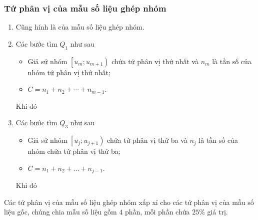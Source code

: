 \subsubsection{Tứ phân vị của mẫu số liệu ghép nhóm}
\begin{enumerate}[\iconMT]
	\item {} Cũng hính là  của mẫu số liệu ghép nhóm.
	\item {} Các bước tìm $Q_1$ như sau
	\begin{itemize}
		\item Giả sử nhóm $ \left[ u_m ; u_{m+1}\right)$ chứa tứ phân vị thứ nhất và $ n_m $ là tần số của nhóm tứ phân vị thứ nhất;
		\item $ C=n_1+n_2+\cdots +n_{m-1} $.
	\end{itemize}
	Khi đó 
	\item {} Các bước tìm $Q_3$ như sau
	\begin{itemize}
		\item Giả sử nhóm $ \left[u_j ; u_{j+1} \right) $ chứa tứ phân vị thứ ba và $ n_j $ là tần số của nhóm chứa tứ phân vị thứ ba;
		\item $ C=n_1+n_2+\ldots+n_{j-1}$.
	\end{itemize}
	Khi đó 
\end{enumerate}
\begin{note}
	 Các tứ phân vị của mẫu số liệu ghép nhóm xấp xỉ cho các tứ phân vị của mẫu số liệu gốc, chúng chia mẫu số liệu gồm $4$ phần, mỗi phần chứa $25\%$ giá trị.
\end{note}




